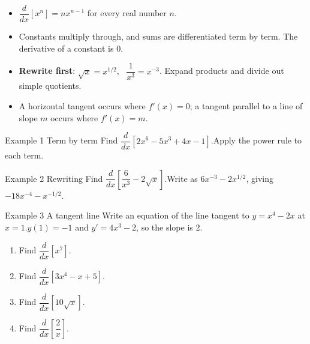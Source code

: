 \documentclass[11pt]{article}
\begin{document}

\begin{ideabox}
\begin{itemize}[leftmargin=*,itemsep=2pt,topsep=2pt]
  \item $\dfrac{d}{dx}\left[x^n\right]=nx^{n-1}$ for every real number $n$.
  \item Constants multiply through, and sums are differentiated term by term. The derivative of a constant is 0.
  \item \textbf{Rewrite first}: $\sqrt{x}=x^{1/2}$, \ $\dfrac{1}{x^3}=x^{-3}$. Expand products and divide out simple quotients.
  \item A horizontal tangent occurs where $f'(x)=0$; a tangent parallel to a line of slope $m$ occurs where $f'(x)=m$.
\end{itemize}
\end{ideabox}

\begin{example}{Example 1 \textperiodcentered{} Term by term}
Find $\dfrac{d}{dx}\left[2x^6-5x^3+4x-1\right]$.\soln Apply the power rule to each term.
\end{example}

\begin{example}{Example 2 \textperiodcentered{} Rewriting}
Find $\dfrac{d}{dx}\left[\dfrac{6}{x^3}-2\sqrt{x}\right]$.\soln Write as $6x^{-3}-2x^{1/2}$, giving $-18x^{-4}-x^{-1/2}$.
\end{example}

\begin{example}{Example 3 \textperiodcentered{} A tangent line}
Write an equation of the line tangent to $y=x^4-2x$ at $x=1$.\soln $y(1)=-1$ and $y'=4x^3-2$, so the slope is 2.
\end{example}

\newpage
{}

\begin{enumerate}[leftmargin=*,itemsep=2pt]
  \item Find $\dfrac{d}{dx}\left[x^7\right]$.\work{2.3cm}
  \item Find $\dfrac{d}{dx}\left[3x^4-x+5\right]$.\work{2.3cm}
  \item Find $\dfrac{d}{dx}\left[10\sqrt{x}\right]$.\work{2.3cm}
  \item Find $\dfrac{d}{dx}\left[\dfrac2x\right]$.\work{2.3cm}
\end{enumerate}
\end{document}
